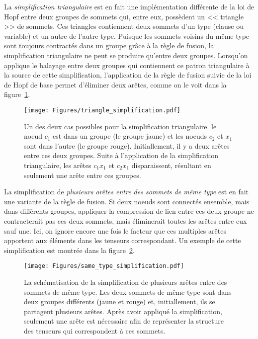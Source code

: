 La \emph{simplification triangulaire} est en fait une implémentation différente de la loi de Hopf entre deux groupes de sommets qui, entre eux, possèdent un << triangle >> de sommets.
Ces triangles contiennent deux sommets d'un type (clause ou variable) et un autre de l'autre type.
Puisque les sommets voisins du même type sont toujours contractés dans un groupe grâce à la règle de fusion, la simplification triangulaire ne peut se produire qu'entre deux groupes.
Lorsqu'on applique le balayage entre deux groupes qui contiennent ce patron triangulaire à la source de cette simplification, l'application de la règle de fusion suivie de la loi de Hopf de base permet d'éliminer deux arêtes, comme on le voit dans la figure~\ref{fig:triangle_rule}.
\begin{figure}[htbp]
    \centering
    \texttt{[image: Figures/triangle\_simplification.pdf]}
    \caption{Un des deux cas possibles pour la simplification triangulaire. le noeud $c_1$ est dans un groupe (le groupe jaune) et les noeuds $c_2$ et $x_1$ sont dans l'autre (le groupe rouge). Initiallement, il y a deux arêtes entre ces deux groupes. Suite à l'application de la simplification triangulaire, les arêtes $c_1x_1$ et $c_2x_1$ disparaissent, résultant en seulement une arête entre ces groupes.}
    \label{fig:triangle_rule}
\end{figure}

La simplification de \emph{plusieurs arêtes entre des sommets de même type} est en fait une variante de la règle de fusion.
Si deux noeuds sont connectés ensemble, mais dans différents groupes, appliquer la compression de lien entre ces deux groupe ne contracterait pas ces deux sommets, mais éliminerait toutes les arêtes entre eux sauf une.
Ici, on ignore encore une fois le facteur que ces multiples arêtes apportent aux éléments dans les tenseurs correspondant.
Un exemple de cette simplification est montrée dans la figure~\ref{fig:same_type_simplification}.
\begin{figure}[htbp]
    \centering
    \texttt{[image: Figures/same\_type\_simplification.pdf]}
    \caption{La schématisation de la simplification de plusieurs arêtes entre des sommets de même type. Les deux sommets de même type sont dans deux groupes différents (jaune et rouge) et, initiallement, ils se partagent plusieurs arêtes. Après avoir appliqué la simplification, seulement une arête est nécessaire afin de représenter la structure des tenseurs qui correspondent à ces sommets.}
    \label{fig:same_type_simplification}
\end{figure}

